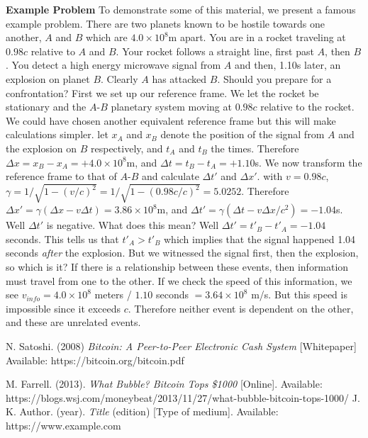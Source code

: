 \documentclass[conference]{IEEEtran}
\begin{document}
\textbf{Example Problem} To demonstrate some of this material, we present a famous example problem. There are two planets known to be hostile towards one another, $A$ and $B$ which are $4.0 \times 10^8 $m apart. You are in a rocket traveling at $0.98c$ relative to $A$ and $B$. Your rocket follows a straight line, first past $A$, then $B$. You detect a high energy microwave signal from $A$ and then, 1.10s later, an explosion on planet $B$. Clearly $A$ has attacked $B$. Should you prepare for a confrontation? First we set up our reference frame. We let the rocket be stationary and the $A$-$B$ planetary system moving at $0.98c$ relative to the rocket. We could have chosen another equivalent reference frame but this will make calculations simpler. let $x_A$ and $x_B$ denote the position of the signal from $A$ and the explosion on $B$ respectively, and $t_A$ and $t_B$ the times. Therefore $\Delta x = x_B - x_A = +4.0 \times 10^8$m, and $\Delta t = t_B - t_A = +1.10$s. We now transform the reference frame to that of $A$-$B$ and calculate $\Delta t'$ and $\Delta x'$. with $v = 0.98c$, $\gamma = 1/\sqrt{1-(v/c)^2} = 1/\sqrt{1-(0.98c/c)^2} = 5.0252$. Therefore $\Delta x' = \gamma(\Delta x - v\Delta t) = 3.86 \times 10^8$m, and $\Delta t' = \gamma (\Delta t - v\Delta x/c^2) = -1.04$s. Well $\Delta t'$ is negative. What does this mean? Well $\Delta t' = t'_B - t'_A = -1.04$ seconds. This tells us that $t'_A > t'_B$ which implies that the signal happened 1.04 seconds \textit{after} the explosion. But we witnessed the signal first, then the explosion, so which is it? If there is a relationship between these events, then information must travel from one to the other. If we check the speed of this information, we see $v_{info} = 4.0 \times 10^8$ meters / $1.10$ seconds $ = 3.64 \times 10^8$ m/s. But this speed is impossible since it exceeds $c$. Therefore neither event is dependent on the other, and these are unrelated events. 

\begin{thebibliography}{9}
	
	N. Satoshi. 
	(2008)
	\textit{Bitcoin: A Peer-to-Peer Electronic Cash System}
	[Whitepaper]
	Available: https://bitcoin.org/bitcoin.pdf

	M. Farrell. 
	(2013).	
	\textit{What Bubble? Bitcoin Tops \$1000}
	[Online].
	Available: https://blogs.wsj.com/moneybeat/2013/11/27/what-bubble-bitcoin-tops-1000/
	J. K. Author. 
	(year).	
	\textit{Title}
	(edition)
	[Type of medium].
	Available: https://www.example.com
\end{thebibliography}
\end{document}
